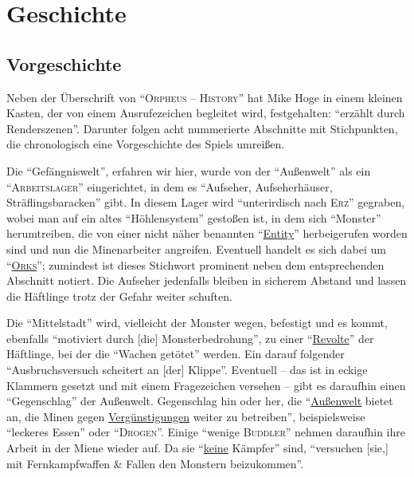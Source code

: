 \documentclass[a5paper,pagesize,numbers=noenddot]{scrbook}
\begin{document}
\clearpage
\section{Geschichte}\label{sec:orpheus_geschichte}


\subsection{Vorgeschichte}\label{sec:orpheus_geschichte_vorgeschichte}
Neben der Überschrift von \enquote{\textsc{Orpheus -- History}} hat Mike Hoge in einem kleinen Kasten, der von einem Ausrufezeichen begleitet wird, festgehalten:
\enquote{erzählt durch Renderszenen}.
Darunter folgen acht nummerierte Abschnitte mit Stichpunkten, die chronologisch eine Vorgeschichte des Spiels umreißen.

Die \enquote{Gefängniswelt}, erfahren wir hier, wurde von der \enquote{Außenwelt} als ein \enquote{\textsc{Arbeitslager}} eingerichtet, in dem es \enquote{Aufseher, Aufseherhäuser, Sträflingsbaracken} gibt.
In diesem Lager wird \enquote{unterirdisch nach \textsc{Erz}} gegraben, wobei man auf ein altes \enquote{Höhlensystem} gestoßen ist, in dem sich \enquote{Monster} herumtreiben, die von einer nicht näher benannten \enquote{\uline{Entity}} herbeigerufen worden sind und nun die Minenarbeiter angreifen.
Eventuell handelt es sich dabei um \enquote{\textsc{\uline{Orks}}}; zumindest ist dieses Stichwort prominent neben dem entsprechenden Abschnitt notiert.
Die Aufseher jedenfalls bleiben in sicherem Abstand und lassen die Häftlinge trotz der Gefahr weiter schuften.

Die \enquote{Mittelstadt} wird, vielleicht der Monster wegen, befestigt und es kommt, ebenfalls \enquote{motiviert durch [die] Monsterbedrohung}, zu einer \enquote{\uline{Revolte}} der Häftlinge, bei der die \enquote{Wachen getötet} werden.
Ein darauf folgender \enquote{Ausbruchsversuch scheitert an [der] Klippe}.
Eventuell -- das ist in eckige Klammern gesetzt und mit einem Fragezeichen versehen -- gibt es daraufhin einen \enquote{Gegenschlag} der Außenwelt.
Gegenschlag hin oder her, die \enquote{\uline{Außenwelt} bietet an, die Minen gegen \uline{Vergünstigungen} weiter zu betreiben}, beispielsweise \enquote{leckeres Essen} oder \enquote{\textsc{Drogen}}.
Einige \enquote{wenige \textsc{Buddler}} nehmen daraufhin ihre Arbeit in der Miene wieder auf. Da sie \enquote{\uline{keine} Kämpfer} sind, \enquote{versuchen [sie,] mit Fernkampfwaffen \& Fallen den Monstern beizukommen}.
\end{document}
